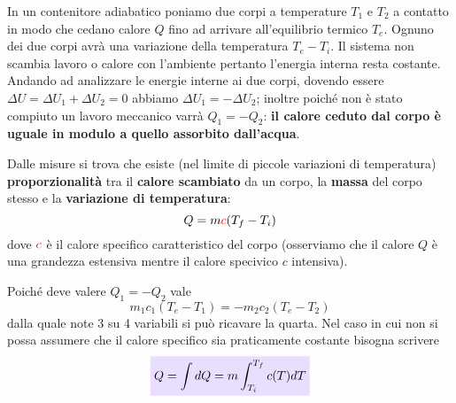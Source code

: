\documentclass[x11names]{article}
\newcommand{\viola}[1]{\colorbox{myred}{$\displaystyle #1$}}
\begin{document}
	\noindent
	In un contenitore adiabatico poniamo due corpi a temperature \(T_1\) e \(T_2\) a contatto  in modo che cedano calore \(Q\) fino ad arrivare all'equilibrio termico \(T_e\). Ognuno dei due corpi avrà una variazione della temperatura \(T_{e} - T_i\). 
	Il sistema non scambia lavoro o calore con l'ambiente pertanto l'energia interna resta costante. Andando ad analizzare le energie interne ai due corpi, dovendo essere \(\Delta U = \Delta U_1 + \Delta U_2 = 0\) abbiamo \(\Delta U_1 = -\Delta U_2\); inoltre poiché non è stato compiuto un lavoro meccanico varrà \(Q_1 = -Q_2\): \textbf{il calore ceduto dal corpo è uguale in modulo a quello assorbito dall'acqua}.
	
	
	Dalle misure si trova che esiste (nel limite di piccole variazioni di temperatura) \textbf{proporzionalità} tra il \textbf{calore scambiato} da un corpo, la \textbf{massa} del corpo stesso e la \textbf{variazione di temperatura}:
	\[ 
	Q = m \textcolor{red}{c}(T_f - T_i)
	\]
	dove \(\textcolor{red}{c}\) è il calore specifico caratteristico del corpo (osserviamo che il calore \(Q\) è una grandezza estensiva mentre il calore specivico \(c\) intensiva).
	
	Poiché deve valere \(Q_1 = -Q_2\) vale
	\[ 
	m_1 c_1(T_e - T_1) = -m_2 c_2(T_e - T_2)
	\]
	dalla quale note 3 su 4 variabili si può ricavare la quarta. Nel caso in cui non si possa assumere che il calore specifico sia praticamente costante bisogna scrivere
	\begin{equation}
		\viola{Q = \int dQ = m \int_{T_i}^{T_{f}}c(T)dT}
	\end{equation}
	
	
\end{document}

